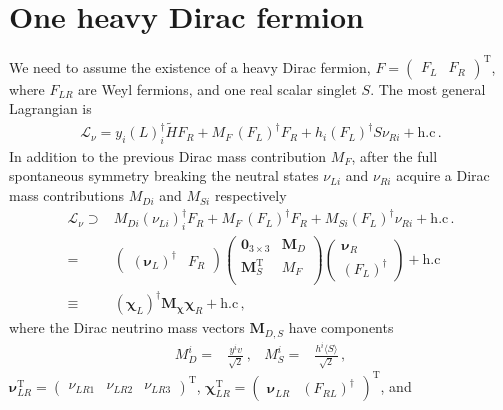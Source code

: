 \section{One heavy Dirac fermion}
We need to assume the existence of a heavy Dirac fermion, $F=
\begin{pmatrix}
  F_L & F_R
\end{pmatrix}^{\operatorname{T}}$, where $F_{LR}$ are Weyl fermions, and one real scalar singlet $S$. The most general Lagrangian is~\cite{Roncadelli:1983ty}
\begin{align}
  \mathcal{L}_{\nu}=y_i \left( L \right)^{\dagger}_i\widetilde{H}  F_R 
  + M_F\, \left( F_L \right)^{\dagger}  F_R + h_i \left( F_L \right)^{\dagger} S \nu_{Ri}+   \text{h.c}\,.
\end{align}
In addition to the previous Dirac mass contribution $M_F$, after the full spontaneous symmetry  breaking the neutral states $\nu_{Li}$ and $\nu_{Ri}$  acquire a Dirac mass contributions $M_{Di}$ and $M_{Si}$ respectively
\begin{align}
  \mathcal{L}_{\nu}\supset & M_{Di} \left( \nu_{Li} \right)^{\dagger}_i  F_R 
  + M_F\, \left( F_L \right)^{\dagger}  F_R + M_{Si} \left( F_L \right)^{\dagger}  \nu_{Ri}+   \text{h.c}\,. \nonumber\\
  =&\begin{pmatrix} \left( \boldsymbol{\nu}_{L} \right)^\dagger  & F_R  \end{pmatrix}
 \begin{pmatrix}
   \mathbf{0}_{3 \times 3} &            \boldsymbol{M}_D \\
   \boldsymbol{M}_S^{\operatorname{T}} & M_F \\
 \end{pmatrix}
\begin{pmatrix} \boldsymbol{\nu}_{R}  \\
    \left( F_L \right)^{\dagger}  \end{pmatrix}+\text{h.c} \nonumber\\
  \equiv& \left( \boldsymbol{\chi}_L \right)^\dagger \boldsymbol{M_{\chi}} \boldsymbol{\chi}_R+\text{h.c}\,,
\end{align}
where the Dirac neutrino mass vectors $\boldsymbol{M}_{D,S}$ have components
\begin{align}
  M_D^i=&\frac{y^i v}{\sqrt{2}}\,,&   M_S^i=&\frac{h^i \langle S\rangle}{\sqrt{2}}\,,
\end{align}
 $\boldsymbol{\nu}_{LR}^{\operatorname{T}}=
\begin{pmatrix}\nu_{LR1} & \nu_{LR2} & \nu_{LR3} \end{pmatrix}^{\operatorname{T}}$, $\boldsymbol{\chi}_{LR}^{\operatorname{T}}=\begin{pmatrix} \boldsymbol{\nu}_{LR}  & \left( F_{RL} \right)^{\dagger}  \end{pmatrix}^{\operatorname{T}}$, and
